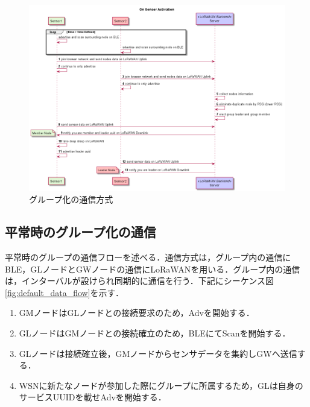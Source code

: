 \begin{figure}[]
    \begin{center}
    \includegraphics[width=14cm]{figures/グループ化_センサ起動時.png}
    \caption{グループ化の通信方式}
    \label{fig:group_on_activation}
    \end{center}
\end{figure}

\subsection{平常時のグループ化の通信}
平常時のグループの通信フローを述べる．通信方式は，グループ内の通信にBLE，GLノードとGWノードの通信にLoRaWANを用いる．グループ内の通信は，インターバルが設けられ同期的に通信を行う．下記にシーケンス図\ref{fig:default_data_flow}を示す．

\begin{enumerate}
    \item GMノードはGLノードとの接続要求のため，Advを開始する．
    \item GLノードはGMノードとの接続確立のため，BLEにてScanを開始する．
    \item GLノードは接続確立後，GMノードからセンサデータを集約しGWへ送信する．
    \item WSNに新たなノードが参加した際にグループに所属するため，GLは自身のサービスUUIDを載せAdvを開始する．
\end{enumerate}


